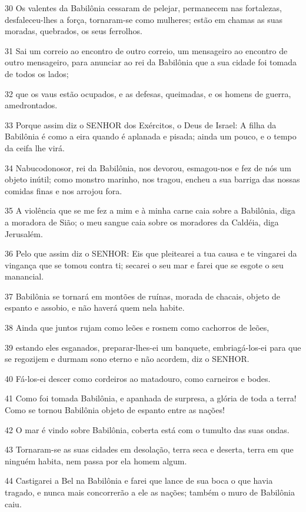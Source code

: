 \par 30 Os valentes da Babilônia cessaram de pelejar, permanecem nas fortalezas, desfaleceu-lhes a força, tornaram-se como mulheres; estão em chamas as suas moradas, quebrados, os seus ferrolhos.
\par 31 Sai um correio ao encontro de outro correio, um mensageiro ao encontro de outro mensageiro, para anunciar ao rei da Babilônia que a sua cidade foi tomada de todos os lados;
\par 32 que os vaus estão ocupados, e as defesas, queimadas, e os homens de guerra, amedrontados.
\par 33 Porque assim diz o SENHOR dos Exércitos, o Deus de Israel: A filha da Babilônia é como a eira quando é aplanada e pisada; ainda um pouco, e o tempo da ceifa lhe virá.
\par 34 Nabucodonosor, rei da Babilônia, nos devorou, esmagou-nos e fez de nós um objeto inútil; como monstro marinho, nos tragou, encheu a sua barriga das nossas comidas finas e nos arrojou fora.
\par 35 A violência que se me fez a mim e à minha carne caia sobre a Babilônia, diga a moradora de Sião; o meu sangue caia sobre os moradores da Caldéia, diga Jerusalém.
\par 36 Pelo que assim diz o SENHOR: Eis que pleitearei a tua causa e te vingarei da vingança que se tomou contra ti; secarei o seu mar e farei que se esgote o seu manancial.
\par 37 Babilônia se tornará em montões de ruínas, morada de chacais, objeto de espanto e assobio, e não haverá quem nela habite.
\par 38 Ainda que juntos rujam como leões e rosnem como cachorros de leões,
\par 39 estando eles esganados, preparar-lhes-ei um banquete, embriagá-los-ei para que se regozijem e durmam sono eterno e não acordem, diz o SENHOR.
\par 40 Fá-los-ei descer como cordeiros ao matadouro, como carneiros e bodes.
\par 41 Como foi tomada Babilônia, e apanhada de surpresa, a glória de toda a terra! Como se tornou Babilônia objeto de espanto entre as nações!
\par 42 O mar é vindo sobre Babilônia, coberta está com o tumulto das suas ondas.
\par 43 Tornaram-se as suas cidades em desolação, terra seca e deserta, terra em que ninguém habita, nem passa por ela homem algum.
\par 44 Castigarei a Bel na Babilônia e farei que lance de sua boca o que havia tragado, e nunca mais concorrerão a ele as nações; também o muro de Babilônia caiu.
